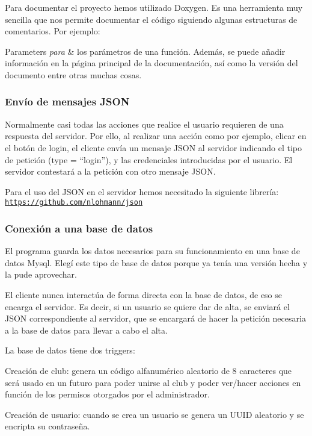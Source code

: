 Para documentar el proyecto hemos utilizado Doxygen. Es una herramienta muy sencilla que nos permite documentar el código siguiendo algunas estructuras de comentarios. Por ejemplo\+:
\begin{DoxyParams}{Parameters}
{\em para} & los parámetros de una función. Además, se puede añadir información en la página principal de la documentación, así como la versión del documento entre otras muchas cosas.\\
\hline
\end{DoxyParams}
\subsubsection*{Envío de mensajes J\+S\+ON}

Normalmente casi todas las acciones que realice el usuario requieren de una respuesta del servidor. Por ello, al realizar una acción como por ejemplo, clicar en el botón de login, el cliente envía un mensaje J\+S\+ON al servidor indicando el tipo de petición (type = “login”), y las credenciales introducidas por el usuario. El servidor contestará a la petición con otro mensaje J\+S\+ON.

Para el uso del J\+S\+ON en el servidor hemos necesitado la siguiente librería\+: \href{https://github.com/nlohmann/json}{\tt https\+://github.\+com/nlohmann/json}

\subsubsection*{Conexión a una base de datos}

El programa guarda los datos necesarios para su funcionamiento en una base de datos Mysql. Elegí este tipo de base de datos porque ya tenía una versión hecha y la pude aprovechar.

El cliente nunca interactúa de forma directa con la base de datos, de eso se encarga el servidor. Es decir, si un usuario se quiere dar de alta, se enviará el J\+S\+ON correspondiente al servidor, que se encargará de hacer la petición necesaria a la base de datos para llevar a cabo el alta.

La base de datos tiene dos triggers\+:


\begin{DoxyItemize}
\item Creación de club\+: genera un código alfanumérico aleatorio de 8 caracteres que será usado en un futuro para poder unirse al club y poder ver/hacer acciones en función de los permisos otorgados por el administrador.
\item Creación de usuario\+: cuando se crea un usuario se genera un U\+U\+ID aleatorio y se encripta su contraseña.
\end{DoxyItemize}

